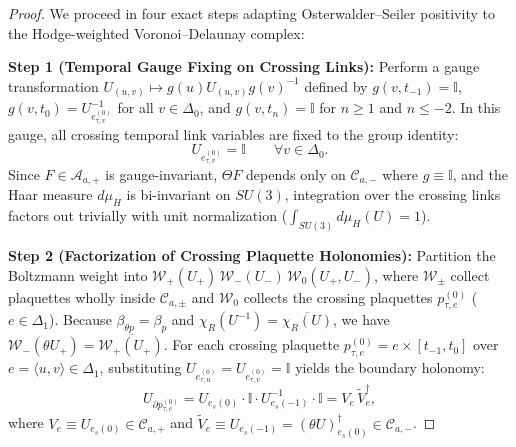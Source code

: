 \documentclass[11pt, a4paper]{article}
\theoremstyle{definition}
\theoremstyle{remark}
\begin{document}
\begin{proof}
We proceed in four exact steps adapting Osterwalder--Seiler positivity to the Hodge-weighted Voronoi--Delaunay complex:

\textbf{Step 1 (Temporal Gauge Fixing on Crossing Links):} Perform a gauge transformation $U_{(u,v)} \mapsto g(u)U_{(u,v)}g(v)^{-1}$ defined by $g(v, t_{-1}) = \mathbb{I}$, $g(v, t_{0}) = U_{e_{\tau, v}^{(0)}}^{-1}$ for all $v \in \Delta_{0}$, and $g(v, t_{n}) = \mathbb{I}$ for $n \ge 1$ and $n \le -2$. In this gauge, all crossing temporal link variables are fixed to the group identity:
\begin{equation}
  U_{e_{\tau, v}^{(0)}} = \mathbb{I} \qquad \forall v \in \Delta_{0}.
\end{equation}
Since $F \in \mathcal{A}_{a,+}$ is gauge-invariant, $\Theta F$ depends only on $\mathcal{C}_{a,-}$ where $g \equiv \mathbb{I}$, and the Haar measure $d\mu_{H}$ is bi-invariant on $SU(3)$, integration over the crossing links factors out trivially with unit normalization ($\int_{SU(3)} d\mu_{H}(U) = 1$).

\textbf{Step 2 (Factorization of Crossing Plaquette Holonomies):} Partition the Boltzmann weight into $\mathcal{W}_{+}(U_{+})\,\mathcal{W}_{-}(U_{-})\,\mathcal{W}_{0}(U_{+}, U_{-})$, where $\mathcal{W}_{\pm}$ collect plaquettes wholly inside $\mathcal{C}_{a,\pm}$ and $\mathcal{W}_{0}$ collects the crossing plaquettes $p_{\tau, e}^{(0)}$ ($e \in \Delta_{1}$). Because $\beta_{\theta p} = \beta_{p}$ and $\chi_{R}(U^{-1}) = \overline{\chi_{R}(U)}$, we have $\mathcal{W}_{-}(\theta U_{+}) = \overline{\mathcal{W}_{+}(U_{+})}$. For each crossing plaquette $p_{\tau, e}^{(0)} = e \times [t_{-1}, t_{0}]$ over $e = \langle u, v \rangle \in \Delta_{1}$, substituting $U_{e_{\tau, u}^{(0)}} = U_{e_{\tau, v}^{(0)}} = \mathbb{I}$ yields the boundary holonomy:
\begin{equation}
  U_{\partial p_{\tau, e}^{(0)}} = U_{e_{s}(0)} \cdot \mathbb{I} \cdot U_{e_{s}(-1)}^{-1} \cdot \mathbb{I} = V_{e}\,\widetilde{V}_{e}^{\dagger},
\end{equation}
where $V_{e} \equiv U_{e_{s}(0)} \in \mathcal{C}_{a,+}$ and $\widetilde{V}_{e} \equiv U_{e_{s}(-1)} = (\theta U)_{e_{s}(0)}^{\dagger} \in \mathcal{C}_{a,-}$.


\end{proof}
\end{document}
